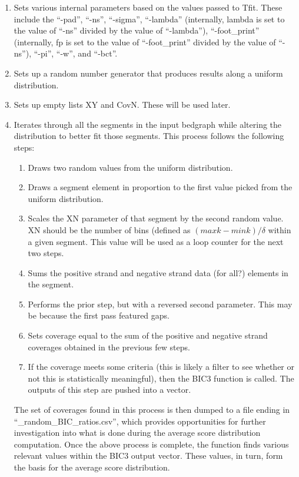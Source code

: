 \documentclass[12pt,letterpaper]{article}
\begin{document}
\begin{enumerate}
\item Sets various internal parameters based on the values passed to Tfit. These include the ``-pad'', ``-ns'', ``-sigma'', ``-lambda'' (internally, lambda is set to the value of ``-ns'' divided by the value of ``-lambda''), ``-foot\_print'' (internally, fp is set to the value of ``-foot\_print'' divided by the value of ``-ns''), ``-pi'', ``-w'', and ``-bct''.
\item Sets up a random number generator that produces results along a uniform distribution.
\item Sets up empty lists XY and CovN. These will be used later.
\item Iterates through all the segments in the input bedgraph while altering the distribution to better fit those segments. This process follows the following steps:
    \begin{enumerate}
        \item Draws two random values from the uniform distribution.
        \item Draws a segment element in proportion to the first value picked from the uniform distribution.
        \item Scales the XN parameter of that segment by the second random value. XN should be the number of bins (defined as $(maxk - mink) / \delta$ within a given segment. This value will be used as a loop counter for the next two steps.
        \item Sums the positive strand and negative strand data (for all?) elements in the segment.
        \item Performs the prior step, but with a reversed second parameter. This may be because the first pass featured gaps.
        \item Sets coverage equal to the sum of the positive and negative strand coverages obtained in the previous few steps. 
        \item If the coverage meets some criteria (this is likely a filter to see whether or not this is statistically meaningful), then the BIC3 function is called. The outputs of this step are pushed into a vector.
    \end{enumerate}
    
    The set of coverages found in this process is then dumped to a file ending in ``\_random\_BIC\_ratios.csv'', which provides opportunities for further investigation into what is done during the average score distribution computation. Once the above process is complete, the function finds various relevant values within the BIC3 output vector. These values, in turn, form the basis for the average score distribution. 

\end{enumerate}
\end{document}
